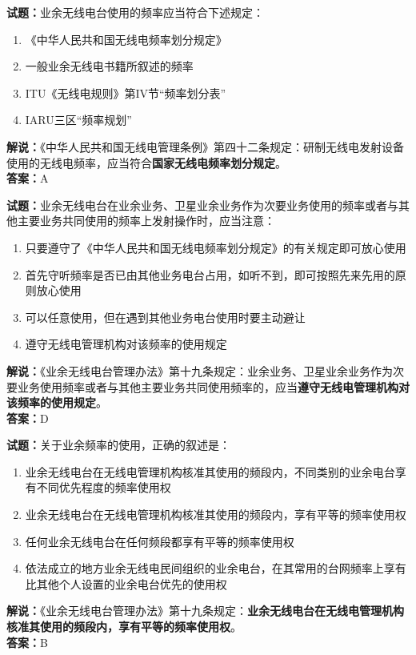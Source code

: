 \documentclass{ctexbook}
\begin{document}
\bigskip

\noindent\textbf{试题：}业余无线电台使用的频率应当符合下述规定：
\begin{enumerate}[leftmargin=3em]
  \item 《中华人民共和国无线电频率划分规定》
  \item 一般业余无线电书籍所叙述的频率
  \item ITU《无线电规则》第IV节“频率划分表”
  \item IARU三区“频率规划”
\end{enumerate}
\noindent\textbf{解说：}《中华人民共和国无线电管理条例》第四十二条规定：研制无线电发射设备使用的无线电频率，应当符合\textbf{国家无线电频率划分规定}。\\\noindent\textbf{答案：}A

\bigskip

\noindent\textbf{试题：}业余无线电台在业余业务、卫星业余业务作为次要业务使用的频率或者与其他主要业务共同使用的频率上发射操作时，应当注意：
\begin{enumerate}[leftmargin=3em]
  \item 只要遵守了《中华人民共和国无线电频率划分规定》的有关规定即可放心使用
  \item 首先守听频率是否已由其他业务电台占用，如听不到，即可按照先来先用的原则放心使用
  \item 可以任意使用，但在遇到其他业务电台使用时要主动避让
  \item 遵守无线电管理机构对该频率的使用规定
\end{enumerate}
\noindent\textbf{解说：}《业余无线电台管理办法》第十九条规定：业余业务、卫星业余业务作为次要业务使用频率或者与其他主要业务共同使用频率的，应当\textbf{遵守无线电管理机构对该频率的使用规定}。\\\noindent\textbf{答案：}D

\bigskip

\noindent\textbf{试题：}关于业余频率的使用，正确的叙述是：
\begin{enumerate}[leftmargin=3em]
  \item 业余无线电台在无线电管理机构核准其使用的频段内，不同类别的业余电台享有不同优先程度的频率使用权
  \item 业余无线电台在无线电管理机构核准其使用的频段内，享有平等的频率使用权
  \item 任何业余无线电台在任何频段都享有平等的频率使用权
  \item 依法成立的地方业余无线电民间组织的业余电台，在其常用的台网频率上享有比其他个人设置的业余电台优先的使用权
\end{enumerate}
\noindent\textbf{解说：}《业余无线电台管理办法》第十九条规定：\textbf{业余无线电台在无线电管理机构核准其使用的频段内，享有平等的频率使用权}。\\\noindent\textbf{答案：}B
\end{document}
